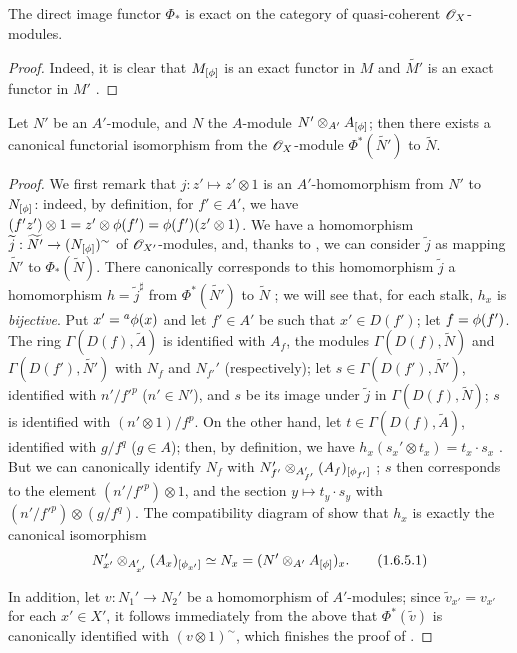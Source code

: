\begin{corollary}[1.6.4]
\label{I.1.6.4}
The direct image functor $\Phi_*$ is exact on the category of quasi-coherent $\mathscr{O}_X$-modules.
\end{corollary}

\begin{proof}
\label{proof-I.1.6.4}
Indeed, it is clear that $M_{[\phi]}$ is an exact functor in $M$ and $\widetilde{M'}$ is an
exact functor in $M'$ .
\end{proof}

\begin{proposition}[1.6.5]
\label{I.1.6.5}
Let $N'$ be an $A'$-module, and $N$ the $A$-module $N'\otimes_{A'}A_{[\phi]}$;
then there exists a canonical functorial isomorphism from the $\mathscr{O}_X$-module $\Phi^*(\widetilde{N'})$ to $\widetilde{N}$.
\end{proposition}

\begin{proof}
\label{proof-I.1.6.5}
We first remark that $j:z'\mapsto z'\otimes 1$ is an $A'$-homomorphism from $N'$ to $N_{[\phi]}$: indeed, by definition, for $f'\in A'$, we have $(f' z')\otimes 1=z'\otimes\phi(f')=\phi(f')(z'\otimes 1)$.
We have  a homomorphism $\widetilde{j}:\widetilde{N'}\to(N_{[\vphi]})^\sim$ of $\mathscr{O}_{X'}$-modules, and, thanks to , we can consider $\widetilde{j}$ as mapping $\widetilde{N'}$ to $\Phi_*(\widetilde{N})$.
There canonically corresponds to this homomorphism $\widetilde{j}$ a homomorphism $h=\widetilde{j}^\sharp$ from $\Phi^*(\widetilde{N'})$ to $\widetilde{N}$ ;
we will see that, for each stalk, $h_x$ is \emph{bijective}.
Put $x'={}^a\phi(x)$ and let $f'\in A'$ be such that $x'\in D(f')$;
let $f=\phi(f')$.
The ring $\Gamma(D(f),\widetilde{A})$ is identified with $A_f$, the modules
$\Gamma(D(f),\widetilde{N})$ and $\Gamma(D(f'),\widetilde{N'})$ with $N_f$ and $N_{f'}'$
(respectively);
let $s\in\Gamma(D(f'),\widetilde{N'})$, identified with $n'/{f'}^p$ ($n'\in N'$), and $s$ be its image under $\widetilde{j}$ in $\Gamma(D(f),\widetilde{N})$;
$s$ is identified with $(n'\otimes 1)/f^p$.
On the other hand, let $t\in\Gamma(D(f),\widetilde{A})$, identified with $g/f^q$ ($g\in A$);
then, by definition, we have $h_x(s_x'\otimes t_x)=t_x\cdot s_x$ .
But we can canonically identify $N_f$ with $N_{f'}'\otimes_{A_{f'}'}(A_f)_{[\phi_{f'}]}$ ;
$s$ then corresponds to the element $(n'/{f'}^p)\otimes 1$, and the section $y\mapsto t_y\cdot s_y$ with $(n'/{f'}^p)\otimes(g/f^q)$.
The compatibility diagram of  show that $h_x$ is exactly the canonical isomorphism
\[
  \label{I.1.6.5.1}
  N_{x'}'\otimes_{A_{x'}'}(A_x)_{[\phi_{x'}]}\simeq N_x=(N'\otimes_{A'}A_{[\phi]})_x.
  \tag{1.6.5.1}
\]

In addition, let $v:N_1'\to N_2'$ be a homomorphism of $A'$-modules;
since $\widetilde{v}_{x'}=v_{x'}$ for each $x'\in X'$, it follows immediately from the above that $\Phi^*(\widetilde{v})$ is canonically identified with $(v\otimes 1)^\sim$, which finishes the proof of .
\end{proof}

